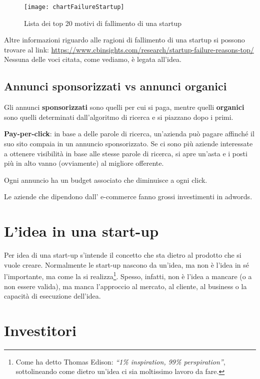 \begin{figure}[t]
\texttt{[image: chartFailureStartup]}
\caption{Lista dei top 20 motivi di fallimento di una startup}
\end{figure}

Altre informazioni riguardo alle ragioni di fallimento di una startup si possono
trovare al link:
\url{https://www.cbinsights.com/research/startup-failure-reasons-top/}
Nessuna delle voci citata, come vediamo, è legata all'idea.

\subsection{Annunci sponsorizzati vs annunci organici}

Gli annunci \textbf{sponsorizzati} sono quelli per cui si paga, mentre quelli
\textbf{organici} sono quelli determinati dall'algoritmo di ricerca e si
piazzano dopo i primi.

\textbf{Pay-per-click}: in base a delle parole di ricerca, un'azienda può pagare
affinché il suo sito compaia in un annuncio sponsorizzato. Se ci sono più
aziende interessate a ottenere visibilità in base alle stesse parole di
ricerca, si apre un'asta e i posti più in alto vanno (ovviamente) al migliore
offerente.

Ogni annuncio ha un budget associato che diminuisce a ogni click.

Le aziende che dipendono dall' e-commerce fanno grossi investimenti in adwords.

\section{L'idea in una start-up}

Per idea di una start-up s'intende il concetto che sta dietro al prodotto che
si vuole creare. Normalmente le start-up nascono da un'idea, ma non è l'idea in
sé l'importante, ma come la si realizza\footnote{Come ha detto Thomas Edison:
\emph{``1\% inspiration, 99\% perspiration''}, sottolineando come dietro un'idea
ci sia moltissimo lavoro da fare.}. Spesso, infatti, non è l'idea a mancare
(o a non essere valida), ma manca l'approccio al mercato, al cliente, al
business o la capacità di esecuzione dell'idea.

\section{Investitori}

